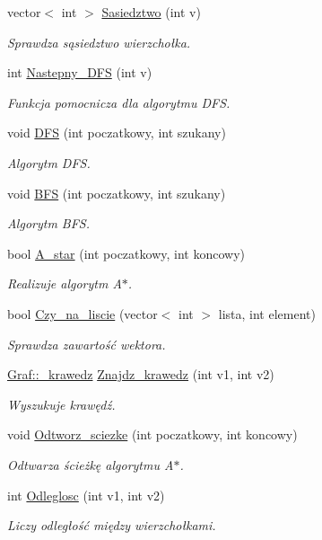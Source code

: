 \begin{DoxyCompactItemize}
vector$<$ int $>$ \hyperlink{class_graf_a046d281f1698f8072bf60e4da71bc675}{\-Sasiedztwo} (int v)
\begin{DoxyCompactList}\small\item\em \-Sprawdza sąsiedztwo wierzchołka. \end{DoxyCompactList}\item 
int \hyperlink{class_graf_a305624fe0009aab3fbbcb1a849de3786}{\-Nastepny\-\_\-\-D\-F\-S} (int v)
\begin{DoxyCompactList}\small\item\em \-Funkcja pomocnicza dla algorytmu \-D\-F\-S. \end{DoxyCompactList}\item 
void \hyperlink{class_graf_a92a75c629930662bb43b72f0d44f8c63}{\-D\-F\-S} (int poczatkowy, int szukany)
\begin{DoxyCompactList}\small\item\em \-Algorytm \-D\-F\-S. \end{DoxyCompactList}\item 
void \hyperlink{class_graf_aa101a5b533a42b4d9c447e8891920fe9}{\-B\-F\-S} (int poczatkowy, int szukany)
\begin{DoxyCompactList}\small\item\em \-Algorytm \-B\-F\-S. \end{DoxyCompactList}\item 
bool \hyperlink{class_graf_a6c44918b1313dc1757fc01c18dde3b80}{\-A\-\_\-star} (int poczatkowy, int koncowy)
\begin{DoxyCompactList}\small\item\em \-Realizuje algorytm \-A$\ast$. \end{DoxyCompactList}\item 
bool \hyperlink{class_graf_a849aea670db767445a6c98eefa5ee43e}{\-Czy\-\_\-na\-\_\-liscie} (vector$<$ int $>$ lista, int element)
\begin{DoxyCompactList}\small\item\em \-Sprawdza zawartość wektora. \end{DoxyCompactList}\item 
\hyperlink{struct_graf_1_1__krawedz}{\-Graf\-::\-\_\-krawedz} \hyperlink{class_graf_aa15a3c01cfdf981650654ebaed04e4e1}{\-Znajdz\-\_\-krawedz} (int v1, int v2)
\begin{DoxyCompactList}\small\item\em \-Wyszukuje krawędź. \end{DoxyCompactList}\item 
void \hyperlink{class_graf_aa4c11c9a82e3b4a786f5327cc6d17d80}{\-Odtworz\-\_\-sciezke} (int poczatkowy, int koncowy)
\begin{DoxyCompactList}\small\item\em \-Odtwarza ścieżkę algorytmu \-A$\ast$. \end{DoxyCompactList}\item 
int \hyperlink{class_graf_a497d04cd3e5fe9d6b1d98f13ef64d989}{\-Odleglosc} (int v1, int v2)
\begin{DoxyCompactList}\small\item\em \-Liczy odległość między wierzchołkami. \end{DoxyCompactList}\end{DoxyCompactItemize}
